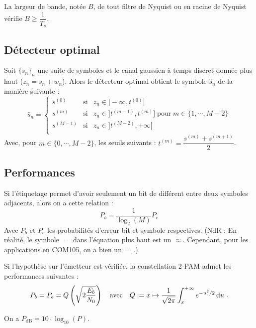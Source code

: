 	\begin{pop}
		La largeur de bande, notée $B$, de tout filtre de Nyquist ou en racine de Nyquist vérifie $B\geq \dfrac{1}{T_{s}}$.
	\end{pop}

\subsection{Détecteur optimal}

	\begin{pop}
		Soit $\{s_n\}_n$ une suite de symboles et le canal gaussien à temps discret donnée plus haut ($z_{n} = s_{n} + w_{n}$). Alors le détecteur optimal obtient le symbole $\hat{s}_n$ de la manière suivante :
		$$\hat{s}_n =
		\left\{ \begin{array}{ccl}
			s^{(0)} & \text{si} & z_n\in ]-\infty ,t^{(0)}] \\
			s^{(m)} & \text{si} & z_n\in ]t^{(m-1)} ,t^{(m)}]\;\text{pour}\; m\in \{1,\cdots, M-2\} \\
			s^{(M-1)} & \text{si} & z_n\in ]t^{(M-2)} ,+\infty[ \\
		\end{array}\right .$$
		Avec, pour $m\in \{0,\cdots,M-2\}$, les seuils suivants : $t^{(m)} = \dfrac{s^{(m)}+s^{(m+1)}}{2}$.
	\end{pop}

\subsection{Performances}

	\begin{pop}
		Si l'étiquetage permet d'avoir seulement un bit de différent entre deux symboles adjacents, alors on a cette relation :
		$$P_b = \frac{1}{\log_2(M)} P_e$$
		Avec $P_b$ et $P_e$ les probabilités d'erreur bit et symbole respectives.
		(NdR : En réalité, le symbole $=$ dans l'équation plus haut est un $\approx$. Cependant, pour les applications en COM105, on a bien un $=$.) %
	\end{pop}

	\begin{pop}
		Si l'hypothèse sur l'émetteur est vérifiée, la constellation 2-PAM admet les performances suivantes :
		$$P_b = P_e = Q \left( \sqrt{2 \frac{E_b}{N_0}} \right) \quad \text{avec} \quad Q := x \mapsto \frac{1}{\sqrt{2\pi}} \int_x^{+\infty} e^{-u^2/2} \mathop{}\mathopen{}\mathrm{d} u\ .$$
	\end{pop}

	\begin{rem}
		On a $P_\text{dB} = 10 \cdot \log_{10} (P)$.
	\end{rem}